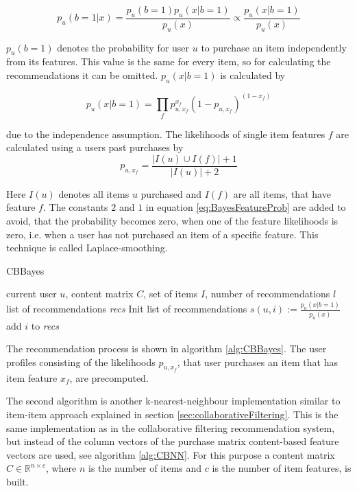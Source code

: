 \documentclass[10pt]{reportMaster}
\begin{document}
\begin{equation}
\label{BayesPost}
	p_u(b=1|x) = \frac{p_u(b=1) p_u(x|b=1)}{p_u(x)} \propto \frac{p_u(x|b=1)}{p_u(x)}
\end{equation}

$p_u(b=1)$ denotes the probability for user $u$ to purchase an item independently from its features.
This value is the same for every item, so for calculating the recommendations it can be omitted.
$p_u(x|b=1)$ is calculated by 

\begin{equation}
\label{BayesEvid}
p_u(x|b=1) = \prod_f{p_{u, x_f}^{x_f}(1-p_{u, x_f})^{(1-x_f)}}
\end{equation}

due to the independence assumption.
The likelihoods of single item features $f$ are calculated using a users past purchases by
\begin{equation}
\label{eq:BayesFeatureProb}
p_{u, x_f} = \frac{|I(u) \cup I(f)|+1}{|I(u)|+2}
\end{equation}

Here $I(u)$ denotes all items $u$ purchased and $I(f)$ are all items, that have feature $f$.
The constants $2$ and $1$ in equation \ref{eq:BayesFeatureProb} are added to avoid, that the probability becomes zero, when one of the feature likelihoods is zero, i.e. when a user has not purchased an item of a specific feature.
This technique is called Laplace-smoothing.

\begin{algorithm}
	\caption{CBBayes}
	\label{alg:CBBayes}
	\begin{algorithmic}[1]
		\Require current user $u$, content matrix $C$, set of items $I$, number of recommendations $l$
		\Ensure list of recommendations \textit{recs}
		\State Init list of recommendations 
			\State 	$s(u,i) := \frac{p_u(x|b=1)}{p_u(x)}$
				\State add $i$ to \textit{recs}
			\EndIf
		\EndFor
	\end{algorithmic}	
\end{algorithm}

The recommendation process is shown in algorithm \ref{alg:CBBayes}.
The user profiles consisting of the likelihoods $p_{u, x_f}$, that user purchases an item that has item feature $x_f$, are precomputed.

The second algorithm is another k-nearest-neighbour implementation similar to item-item approach explained in section \ref{sec:collaborativeFiltering}.
This is the same implementation as in the collaborative filtering recommendation system, but instead of the column vectors of the purchase matrix content-based feature vectors are used, see algorithm \ref{alg:CBNN}.
For this purpose a content matrix $C \in \mathds{R}^{n \times c}$, where $n$ is the number of items and $c$ is the number of item features, is built.
\end{document}
